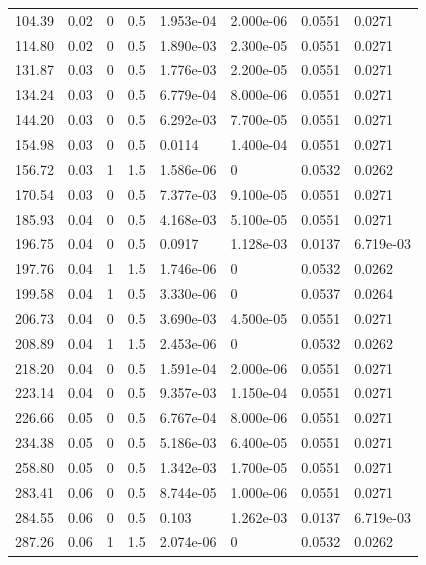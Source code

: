 \documentclass[preview]{standalone}
\begin{document}
{{\begin{tabular}{L{1.2cm}C{1.2cm} C{0.3cm}C{0.5cm} C{1.4cm}C{1.4cm} C{1.4cm}C{1.4cm}}
  104.39  &  0.02  & 0     & 0.5 &  1.953e-04  & 2.000e-06  & 0.0551 &  0.0271   \\ 
  114.80  &  0.02  & 0     & 0.5 &  1.890e-03  & 2.300e-05  & 0.0551 &  0.0271   \\ 
  131.87  &  0.03  & 0     & 0.5 &  1.776e-03  & 2.200e-05  & 0.0551 &  0.0271   \\ 
  134.24  &  0.03  & 0     & 0.5 &  6.779e-04  & 8.000e-06  & 0.0551 &  0.0271   \\ 
  144.20  &  0.03  & 0     & 0.5 &  6.292e-03  & 7.700e-05  & 0.0551 &  0.0271   \\ 
  154.98  &  0.03  & 0     & 0.5 &  0.0114  & 1.400e-04  & 0.0551 &  0.0271   \\ 
  156.72  &  0.03  & 1     & 1.5 &  1.586e-06  & 0  & 0.0532 &  0.0262   \\ 
  170.54  &  0.03  & 0     & 0.5 &  7.377e-03  & 9.100e-05  & 0.0551 &  0.0271   \\ 
  185.93  &  0.04  & 0     & 0.5 &  4.168e-03  & 5.100e-05  & 0.0551 &  0.0271   \\ 
  196.75  &  0.04  & 0     & 0.5 &  0.0917  & 1.128e-03  & 0.0137 &  6.719e-03   \\ 
  197.76  &  0.04  & 1     & 1.5 &  1.746e-06  & 0  & 0.0532 &  0.0262   \\ 
  199.58  &  0.04  & 1     & 0.5 &  3.330e-06  & 0  & 0.0537 &  0.0264   \\ 
  206.73  &  0.04  & 0     & 0.5 &  3.690e-03  & 4.500e-05  & 0.0551 &  0.0271   \\ 
  208.89  &  0.04  & 1     & 1.5 &  2.453e-06  & 0  & 0.0532 &  0.0262   \\ 
  218.20  &  0.04  & 0     & 0.5 &  1.591e-04  & 2.000e-06  & 0.0551 &  0.0271   \\ 
  223.14  &  0.04  & 0     & 0.5 &  9.357e-03  & 1.150e-04  & 0.0551 &  0.0271   \\ 
  226.66  &  0.05  & 0     & 0.5 &  6.767e-04  & 8.000e-06  & 0.0551 &  0.0271   \\ 
  234.38  &  0.05  & 0     & 0.5 &  5.186e-03  & 6.400e-05  & 0.0551 &  0.0271   \\ 
  258.80  &  0.05  & 0     & 0.5 &  1.342e-03  & 1.700e-05  & 0.0551 &  0.0271   \\ 
  283.41  &  0.06  & 0     & 0.5 &  8.744e-05  & 1.000e-06  & 0.0551 &  0.0271   \\ 
  284.55  &  0.06  & 0     & 0.5 &  0.103  & 1.262e-03  & 0.0137 &  6.719e-03   \\ 
  287.26  &  0.06  & 1     & 1.5 &  2.074e-06  & 0  & 0.0532 &  0.0262   \\ 

\end{tabular}}}
\end{document}
